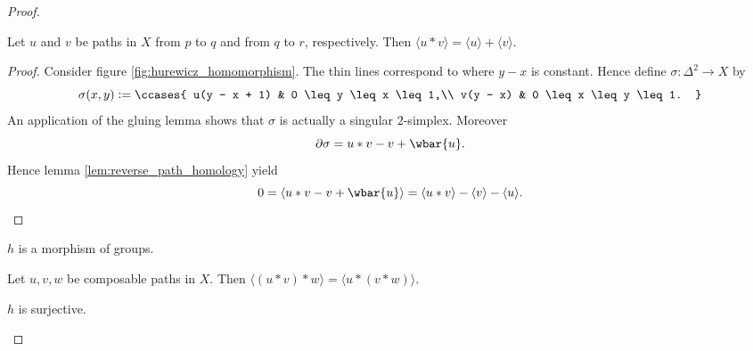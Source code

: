 \begin{proof}
	\begin{lemma}
		\label{lem:concatenation_addition}
		Let $u$ and $v$ be paths in $X$ from $p$ to $q$ and from $q$ to $r$, respectively. Then $\langle u \ast v \rangle = \langle u \rangle + \langle v \rangle$.	
	\end{lemma}

	\begin{proof}
		Consider figure \ref{fig:hurewicz_homomorphism}. The thin lines correspond to where $y - x$ is constant. Hence define $\sigma : \Delta^2 \to X$ by
		\begin{equation*}
			\sigma(x,y) := \ccases{
				u(y - x + 1) & 0 \leq y \leq x \leq 1,\\
				v(y - x) & 0 \leq x \leq y \leq 1.
			}
		\end{equation*}
		An application of the gluing lemma shows that $\sigma$ is actually a singular $2$-simplex. Moreover
		\begin{equation*}
			\partial \sigma = u \ast v - v + \wbar{u}.
		\end{equation*}
		Hence lemma \ref{lem:reverse_path_homology} yield
		\begin{equation*}
			0 = \langle u \ast v - v + \wbar{u}\rangle = \langle u \ast v \rangle - \langle v \rangle - \langle u \rangle.
		\end{equation*}
	\end{proof}

	\begin{corollary}
		\label{cor:h_homomorphism}
		$h$ is a morphism of groups.
	\end{corollary}

	\begin{corollary}
		\label{cor:composable_associative_homology}
		Let $u,v,w$ be composable paths in $X$. Then $\langle (u \ast v) \ast w \rangle = \langle u \ast (v \ast w) \rangle$.
	\end{corollary}

	\begin{lemma}
		$h$ is surjective.
	\end{lemma}


\end{proof}

